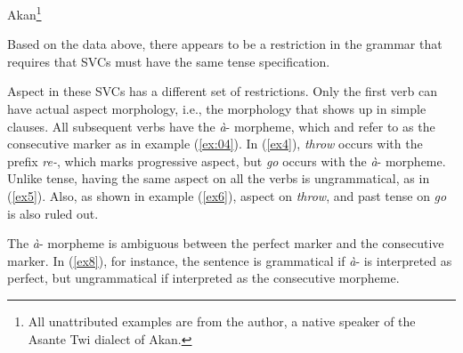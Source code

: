\documentclass[output=paper,colorlinks,citecolor=brown]{langscibook}
\begin{document}
\ea \label{ex0}
Akan\footnote{All unattributed examples are from the author, a native speaker of the Asante Twi dialect of Akan.} 

\z
\z
Based on the data above, there appears to be a restriction in the grammar that requires that SVCs must have the same tense specification.    

Aspect in these SVCs has a different set of restrictions. Only the first verb can have actual aspect morphology, i.e., the morphology that shows up in simple clauses. All subsequent verbs have the \emph{à}- morpheme, which \citet{Dolphyne1996} and \citet{Osam2003} refer to as the consecutive marker as in example (\ref{ex:04}). In (\ref{ex4}), \emph{throw} occurs with the prefix \emph{re-}, which marks progressive aspect, but \emph{go} occurs with the \emph{à}- morpheme. Unlike tense, having the same aspect on all the verbs is ungrammatical, as in (\ref{ex5}). Also, as shown in example (\ref{ex6}), aspect on \emph{throw}, and past tense on \emph{go} is also ruled out. 

\ea\label{ex:04}
\z 
\z 
The \emph{à}- morpheme is ambiguous between the perfect marker and the consecutive marker. In (\ref{ex8}), for instance, the sentence is grammatical if \emph{à}- is interpreted as perfect, but ungrammatical if interpreted as the consecutive morpheme.
\end{document}
